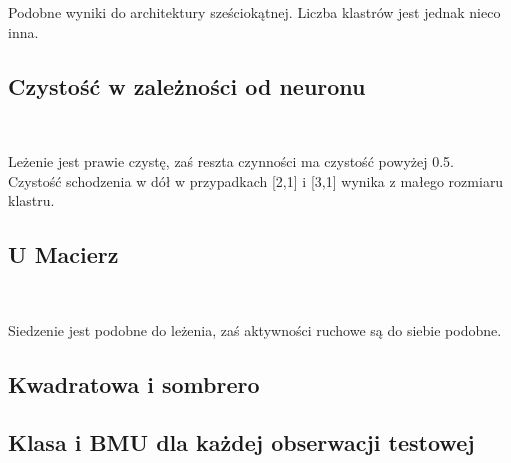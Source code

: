 \documentclass[11pt]{article}
\begin{document}
    Podobne wyniki do architektury sześciokątnej. Liczba klastrów jest
jednak nieco inna.

    \hypertarget{czystoux15bux107-w-zaleux17cnoux15bci-od-neuronu}{%
\subsection{Czystość w zależności od
neuronu}\label{czystoux15bux107-w-zaleux17cnoux15bci-od-neuronu}}

            
        
    
   
    
    \begin{center}
    \end{center}
    { \hspace*{\fill} \\}
    
    Leżenie jest prawie czystę, zaś reszta czynności ma czystość powyżej
0.5. Czystość schodzenia w dół w przypadkach {[}2,1{]} i {[}3,1{]}
wynika z małego rozmiaru klastru.

    \hypertarget{u-macierz}{%
\subsection{U Macierz}\label{u-macierz}}

    \begin{center}
    \end{center}
    { \hspace*{\fill} \\}
    
    Siedzenie jest podobne do leżenia, zaś aktywności ruchowe są do siebie
podobne.

    \hypertarget{kwadratowa-i-sombrero}{%
\subsection{Kwadratowa i sombrero}\label{kwadratowa-i-sombrero}}

    \hypertarget{klasa-i-bmu-dla-kaux17cdej-obserwacji-testowej}{%
\subsection{Klasa i BMU dla każdej obserwacji
testowej}\label{klasa-i-bmu-dla-kaux17cdej-obserwacji-testowej}}
\end{document}
